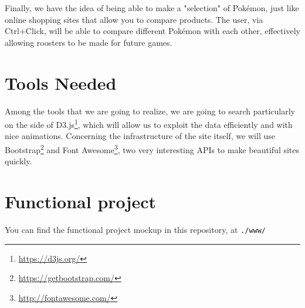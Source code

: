 \documentclass[10pt,conference,compsocconf]{IEEEtran}
\begin{document}
Finally, we have the idea of being able to make a "selection" of Pokémon, just like online shopping sites that allow you to compare products. The user, via Ctrl+Click, will be able to compare different Pokémon with each other, effectively allowing roosters to be made for future games.

\section{Tools Needed}
Among the tools that we are going to realize, we are going to search particularly on the side of D3.js\footnote{\url{https://d3js.org/}}, which will allow us to exploit the data efficiently and with nice animations. Concerning the infrastructure of the site itself, we will use Bootstrap\footnote{\url{https://getbootstrap.com/}} and Font Awesome\footnote{\url{http://fontawesome.com/}}, two very interesting APIs to make beautiful sites quickly.

\section{Functional project}
You can find the functional project mockup in this repository, at \texttt{./www/}
\newpage


\end{document}

